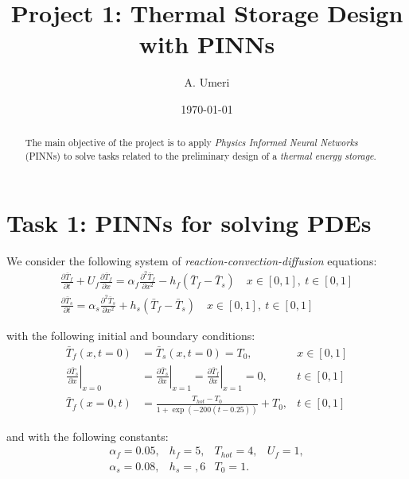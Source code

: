 \documentclass[letterpaper,12pt]{article}
\begin{document}
\title{ \textbf{Project 1: Thermal Storage Design\\
with PINNs}}
\author{A. Umeri}
\date{\today}
\maketitle

\begin{abstract}
The main objective of the project is to apply \textit{Physics Informed Neural Networks} (PINNs) to solve tasks
related to the preliminary design of a \textit{thermal energy storage}.
\end{abstract}
 

\section*{Task 1: PINNs for solving PDEs}
We consider the following system of \textit{reaction-convection-diffusion} equations:
\begin{align*}
\frac{\partial \bar{T}_{f}}{\partial t}+U_{f} \frac{\partial \bar{T}_{f}}{\partial x}=\alpha_{f} \frac{\partial^{2} \bar{T}_{f}}{\partial x^{2}}-h_{f}\left(\bar{T}_{f}-\bar{T}_{s}\right) \quad x \in[0,1],\: t \in[0,1] \\
\frac{\partial \bar{T}_{s}}{\partial t}=\alpha_{s} \frac{\partial^{2} \bar{T}_{s}}{\partial x^{2}}+h_{s}\left(\bar{T}_{f}-\bar{T}_{s}\right) \quad x \in[0,1],\: t \in[0,1] \tag{7}
\end{align*}

with the following initial and boundary conditions:
\begin{align*}
\bar{T}_{f}(x, t=0) & =\bar{T}_{s}(x, t=0)=T_{0}, & x \in[0,1] \\
\left.\frac{\partial \bar{T}_{s}}{\partial x}\right|_{x=0} & =\left.\frac{\partial \bar{T}_{s}}{\partial x}\right|_{x=1}=\left.\frac{\partial \bar{T}_{f}}{\partial x}\right|_{x=1}=0, & t \in[0,1]  \tag{8}\\
\bar{T}_{f}(x=0, t) & =\frac{T_{h o t}-T_{0}}{1+\exp (-200(t-0.25))}+T_{0}, & t \in[0,1] 
\end{align*}

and with the following constants:
\[
\begin{array}{rrrr}
\alpha_{f}=0.05, & h_{f}=5, & T_{h o t}=4, & U_{f}=1,  \tag{9}\\
\alpha_{s}=0.08, & h_{s}=,6 & T_{0}=1. &
\end{array}
\]
\end{document}
